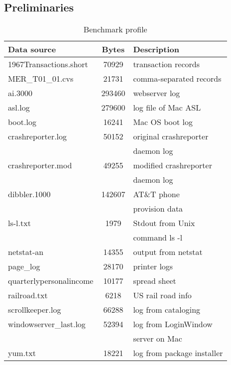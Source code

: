 \subsection{Preliminaries}
\begin{table}
\begin{center}
\begin{tabular}{|l|c|l|} \hline
Data source		& Bytes		& Description \\ \hline \hline
1967Transactions.short	& 70929		& transaction records \\ \hline
MER\_T01\_01.cvs	& 21731 	& comma-separated records\\ \hline
ai.3000			& 293460	& webserver log \\ \hline
asl.log 		& 279600	& log file of Mac ASL \\ \hline	
boot.log		& 16241		& Mac OS boot log \\ \hline
crashreporter.log 	& 50152 	& original crashreporter \\ 
			&		& daemon log \\ \hline
crashreporter.mod 	& 49255		& modified crashreporter \\
			&		& daemon log \\ \hline
dibbler.1000		& 142607 	& AT\&T phone \\
			&		& provision data \\ \hline
ls-l.txt		& 1979		& Stdout from Unix \\
			&		& command ls -l \\ \hline
netstat-an		& 14355		& output from netstat \\ \hline
page\_log		& 28170		& printer logs \\ \hline
quarterlypersonalincome	& 10177		& spread sheet \\ \hline 
railroad.txt		& 6218		& US rail road info \\ \hline
scrollkeeper.log 	& 66288		& log from cataloging \\ \hline
windowserver\_last.log 	& 52394		& log from LoginWindow \\
			&		& server on Mac \\ \hline
yum.txt			& 18221		& log from package installer\\ \hline
\end{tabular}
\caption{Benchmark profile} \label{tab:benchmarks}
\end{center}
\end{table}


